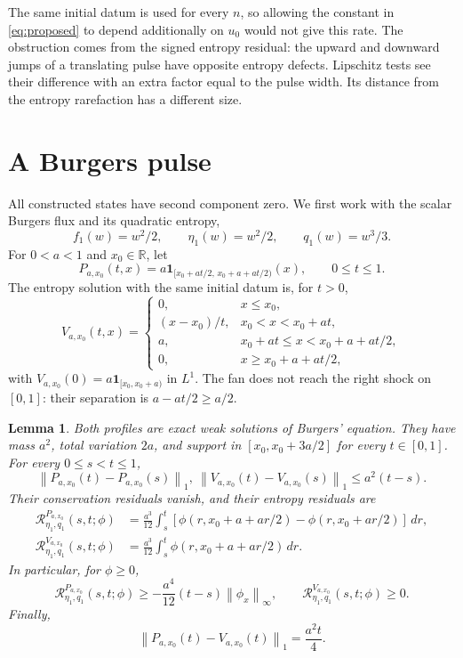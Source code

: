 \documentclass[11pt]{article}
\newtheorem{lemma}[theorem]{Lemma}
\newcommand{\R}{\mathbb R}
\newcommand{\Res}{\mathcal R}
\newcommand{\ind}{\mathbf 1}
\newcommand{\norm}[1]{\left\|#1\right\|}
\begin{document}
The same initial datum is used for every $n$, so allowing the constant in \eqref{eq:proposed} to depend additionally on $u_0$ would not give this rate. The obstruction comes from the signed entropy residual: the upward and downward jumps of a translating pulse have opposite entropy defects. Lipschitz tests see their difference with an extra factor equal to the pulse width. Its distance from the entropy rarefaction has a different size.

\section{A Burgers pulse}

All constructed states have second component zero. We first work with the scalar Burgers flux and its quadratic entropy,
\[
 f_1(w)=w^2/2,\qquad \eta_1(w)=w^2/2,\qquad q_1(w)=w^3/3.
\]
For $0<a<1$ and $x_0\in\R$, let
\begin{equation}\label{eq:pulse}
 P_{a,x_0}(t,x)
 =a\ind_{[x_0+at/2,\,x_0+a+at/2)}(x),\qquad 0\le t\le1.
\end{equation}
The entropy solution with the same initial datum is, for $t>0$,
\begin{equation}\label{eq:fan}
 V_{a,x_0}(t,x)=
 \begin{cases}
 0,&x\le x_0,\\
 (x-x_0)/t,&x_0<x<x_0+at,\\
 a,&x_0+at\le x<x_0+a+at/2,\\
 0,&x\ge x_0+a+at/2,
 \end{cases}
\end{equation}
with $V_{a,x_0}(0)=a\ind_{[x_0,x_0+a)}$ in $L^1$. The fan does not reach the right shock on $[0,1]$: their separation is $a-at/2\ge a/2$.

\begin{lemma}\label{lem:pulse}
Both profiles are exact weak solutions of Burgers' equation. They have mass $a^2$, total variation $2a$, and support in $[x_0,x_0+3a/2]$ for every $t\in[0,1]$. For every $0\le s<t\le1$,
\begin{equation}\label{eq:time}
 \norm{P_{a,x_0}(t)-P_{a,x_0}(s)}_1,
 \ \norm{V_{a,x_0}(t)-V_{a,x_0}(s)}_1
 \le a^2(t-s).
\end{equation}
Their conservation residuals vanish, and their entropy residuals are
\begin{align}
 \Res^{P_{a,x_0}}_{\eta_1,q_1}(s,t;\phi)
 &=\frac{a^3}{12}\int_s^t
  [\phi(r,x_0+a+ar/2)-\phi(r,x_0+ar/2)]\,dr,
 \label{eq:dipole}\\
 \Res^{V_{a,x_0}}_{\eta_1,q_1}(s,t;\phi)
 &=\frac{a^3}{12}\int_s^t\phi(r,x_0+a+ar/2)\,dr.
 \label{eq:good-entropy}
\end{align}
In particular, for $\phi\ge0$,
\begin{equation}\label{eq:pulse-bound}
 \Res^{P_{a,x_0}}_{\eta_1,q_1}(s,t;\phi)
 \ge-\frac{a^4}{12}(t-s)\norm{\phi_x}_\infty,
 \qquad
 \Res^{V_{a,x_0}}_{\eta_1,q_1}(s,t;\phi)\ge0.
\end{equation}
Finally,
\begin{equation}\label{eq:unit-error}
 \norm{P_{a,x_0}(t)-V_{a,x_0}(t)}_1=\frac{a^2t}{4}.
\end{equation}
\end{lemma}
\end{document}
